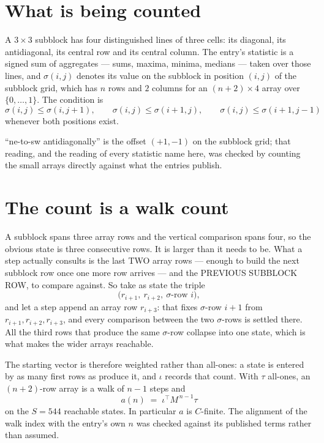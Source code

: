 \documentclass[11pt,a4paper]{article}
\theoremstyle{plain}
\theoremstyle{definition}
\begin{document}
\section{What is being counted}

A $3\times3$ subblock has four distinguished lines of three cells: its diagonal, its
antidiagonal, its central row and its central column. The entry's statistic is a signed sum of
aggregates --- sums, maxima, minima, medians --- taken over those lines, and $\sigma(i,j)$
denotes its value on the subblock in position $(i,j)$ of the subblock grid, which has $n$ rows
and $2$ columns for an $(n+2)\times4$ array over $\{0,\dots,1\}$. The condition is
\[
\sigma(i,j)\le\sigma(i,j+1),\qquad \sigma(i,j)\le\sigma(i+1,j),\qquad \sigma(i,j)\le\sigma(i+1,j-1)
\]
whenever both positions exist.

``ne-to-sw antidiagonally'' is the offset $(+1,-1)$ on the subblock grid; that reading, and
the reading of every statistic name here, was checked by counting the small arrays directly
against what the entries publish.

\section{The count is a walk count}

A subblock spans three array rows and the vertical comparison spans four, so the obvious state
is three consecutive rows. It is larger than it needs to be. What a step actually consults is
the last TWO array rows --- enough to build the next subblock row once one more row arrives ---
and the PREVIOUS SUBBLOCK ROW, to compare against. So take as state the triple
\[
\bigl(r_{i+1},\ r_{i+2},\ \sigma\text{-row }i\bigr),
\]
and let a step append an array row $r_{i+3}$: that fixes $\sigma$-row $i+1$ from
$r_{i+1},r_{i+2},r_{i+3}$, and every comparison between the two $\sigma$-rows is settled
there. All the third rows that produce the same $\sigma$-row collapse into one state, which is
what makes the wider arrays reachable.

The starting vector is therefore weighted rather than all-ones: a state is entered by as many
first rows as produce it, and $\iota$ records that count. With $\tau$ all-ones, an
$(n+2)$-row array is a walk of $n-1$ steps and
\[
a(n)\;=\;\iota^{\!\top}M^{\,n-1}\tau
\]
on the $S=544$ reachable states. In particular $a$ is $C$-finite. The alignment of the walk
index with the entry's own $n$ was checked against its published terms rather than assumed.
\end{document}
